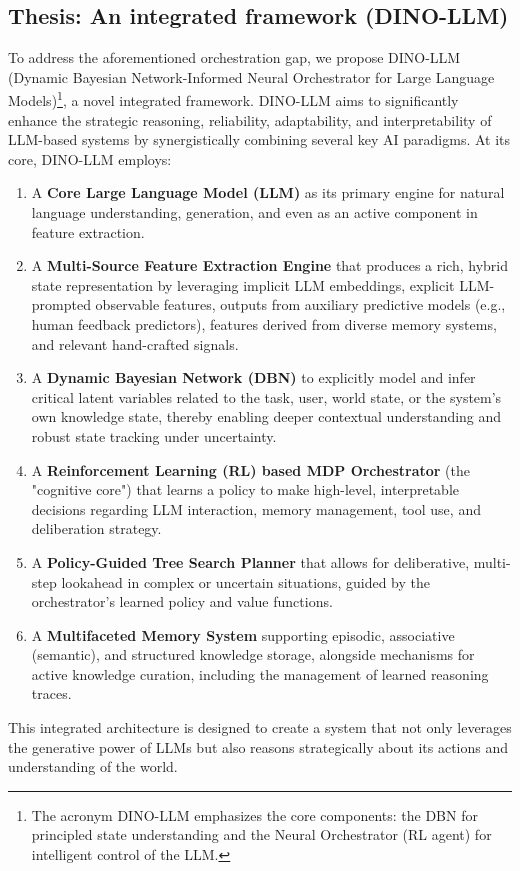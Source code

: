 \documentclass[11pt]{article}
\begin{document}
\subsection{Thesis: An integrated framework (DINO-LLM)}
\label{sec:intro_thesis}
To address the aforementioned orchestration gap, we propose DINO-LLM (Dynamic Bayesian Network-Informed Neural Orchestrator for Large Language Models)\footnote{The acronym DINO-LLM emphasizes the core components: the DBN for principled state understanding and the Neural Orchestrator (RL agent) for intelligent control of the LLM.}, a novel integrated framework. DINO-LLM aims to significantly enhance the strategic reasoning, reliability, adaptability, and interpretability of LLM-based systems by synergistically combining several key AI paradigms. At its core, DINO-LLM employs:
\begin{enumerate}[label=(\arabic*)]
    \item A \textbf{Core Large Language Model (LLM)} as its primary engine for natural language understanding, generation, and even as an active component in feature extraction.
    \item A \textbf{Multi-Source Feature Extraction Engine} that produces a rich, hybrid state representation by leveraging implicit LLM embeddings, explicit LLM-prompted observable features, outputs from auxiliary predictive models (e.g., human feedback predictors), features derived from diverse memory systems, and relevant hand-crafted signals.
    \item A \textbf{Dynamic Bayesian Network (DBN)} to explicitly model and infer critical latent variables related to the task, user, world state, or the system's own knowledge state, thereby enabling deeper contextual understanding and robust state tracking under uncertainty.
    \item A \textbf{Reinforcement Learning (RL) based MDP Orchestrator} (the "cognitive core") that learns a policy to make high-level, interpretable decisions regarding LLM interaction, memory management, tool use, and deliberation strategy.
    \item A \textbf{Policy-Guided Tree Search Planner} that allows for deliberative, multi-step lookahead in complex or uncertain situations, guided by the orchestrator's learned policy and value functions.
    \item A \textbf{Multifaceted Memory System} supporting episodic, associative (semantic), and structured knowledge storage, alongside mechanisms for active knowledge curation, including the management of learned reasoning traces.
\end{enumerate}
This integrated architecture is designed to create a system that not only leverages the generative power of LLMs but also reasons strategically about its actions and understanding of the world.
\end{document}
